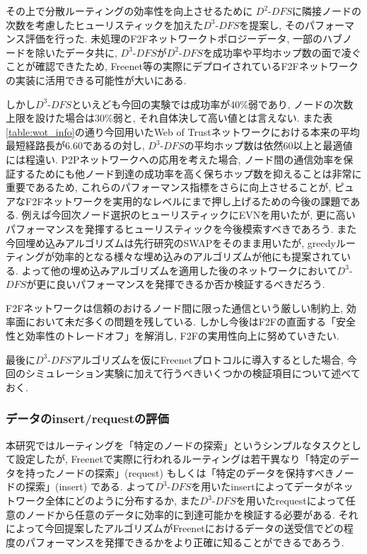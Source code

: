 \documentclass[dvipdfmx]{ampbt}
\begin{document}
その上で分散ルーティングの効率性を向上させるために $D^2$-$DFS$に隣接ノードの次数を考慮したヒューリスティックを加えた$D^3$-$DFS$を提案し, そのパフォーマンス評価を行った. 未処理のF2Fネットワークトポロジーデータ, 一部のハブノードを除いたデータ共に, $D^3$-$DFS$が$D^2$-$DFS$を成功率や平均ホップ数の面で凌ぐことが確認できたため, Freenet等の実際にデプロイされているF2Fネットワークの実装に活用できる可能性が大いにある. 

しかし$D^3$-$DFS$といえども今回の実験では成功率が40\%弱であり, ノードの次数上限を設けた場合は30\%弱と, それ自体決して高い値とは言えない. また表\ref{table:wot_info}の通り今回用いたWeb of Trustネットワークにおける本来の平均最短経路長が6.60であるの対し, $D^3$-$DFS$の平均ホップ数は依然60以上と最適値には程遠い. P2Pネットワークへの応用を考えた場合, ノード間の通信効率を保証するためにも他ノード到達の成功率を高く保ちホップ数を抑えることは非常に重要であるため, これらのパフォーマンス指標をさらに向上させることが, ピュアなF2Fネットワークを実用的なレベルにまで押し上げるための今後の課題である. 例えば今回次ノード選択のヒューリスティックにEVNを用いたが, 更に高いパフォーマンスを発揮するヒューリスティックを今後模索すべきであろう. また今回埋め込みアルゴリズムは先行研究のSWAPをそのまま用いたが, greedyルーティングが効率的となる様々な埋め込みのアルゴリズムが他にも提案されている\cite{boguna2010sustaining, roos2017balanced}. よって他の埋め込みアルゴリズムを適用した後のネットワークにおいて$D^3$-$DFS$が更に良いパフォーマンスを発揮できるか否か検証するべきだろう.

F2Fネットワークは信頼のおけるノード間に限った通信という厳しい制約上, 効率面において未だ多くの問題を残している. しかし今後はF2Fの直面する「安全性と効率性のトレードオフ」を解消し, F2Fの実用性向上に努めていきたい. 

最後に$D^3$-$DFS$アルゴリズムを仮にFreenetプロトコルに導入するとした場合, 今回のシミュレーション実験に加えて行うべきいくつかの検証項目について述べておく.

\subsubsection*{データのinsert/requestの評価}
本研究ではルーティングを「特定のノードの探索」というシンプルなタスクとして設定したが, Freenetで実際に行われるルーティングは若干異なり「特定のデータを持ったノードの探索」(request) もしくは「特定のデータを保持すべきノードの探索」(insert) である. よって$D^3$-$DFS$を用いたinsertによってデータがネットワーク全体にどのように分布するか, また$D^3$-$DFS$を用いたrequestによって任意のノードから任意のデータに効率的に到達可能かを検証する必要がある. それによって今回提案したアルゴリズムがFreenetにおけるデータの送受信でどの程度のパフォーマンスを発揮できるかをより正確に知ることができるであろう. 
\end{document}
